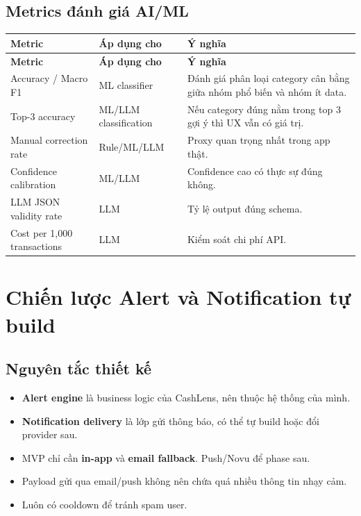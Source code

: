 \documentclass[11pt,a4paper]{article}
\renewcommand{\thead}[1]{\textbf{\color{PrimaryDark}#1}}
\newenvironment{tableblock}{\Needspace{8\baselineskip}\vspace{0.25em}}{\vspace{0.75em}}
\begin{document}
\subsection{Metrics đánh giá AI/ML}
\begin{tableblock}
\scriptsize
\begin{longtable}{L{3.5cm}L{3.6cm}L{8.1cm}}
\thead{Metric} & \thead{Áp dụng cho} & \thead{Ý nghĩa} \\
\endfirsthead
{}\thead{Metric} & \thead{Áp dụng cho} & \thead{Ý nghĩa} \\
\endhead
Accuracy / Macro F1 & ML classifier & Đánh giá phân loại category cân bằng giữa nhóm phổ biến và nhóm ít data. \\
Top-3 accuracy & ML/LLM classification & Nếu category đúng nằm trong top 3 gợi ý thì UX vẫn có giá trị. \\
Manual correction rate & Rule/ML/LLM & Proxy quan trọng nhất trong app thật. \\
Confidence calibration & ML/LLM & Confidence cao có thực sự đúng không. \\
LLM JSON validity rate & LLM & Tỷ lệ output đúng schema. \\
Cost per 1,000 transactions & LLM & Kiểm soát chi phí API. \\
\end{longtable}
\end{tableblock}

\section{Chiến lược Alert và Notification tự build}

\subsection{Nguyên tắc thiết kế}
\begin{itemize}
  \item \textbf{Alert engine} là business logic của CashLens, nên thuộc hệ thống của mình.
  \item \textbf{Notification delivery} là lớp gửi thông báo, có thể tự build hoặc đổi provider sau.
  \item MVP chỉ cần \textbf{in-app} và \textbf{email fallback}. Push/Novu để phase sau.
  \item Payload gửi qua email/push không nên chứa quá nhiều thông tin nhạy cảm.
  \item Luôn có cooldown để tránh spam user.
\end{itemize}
\end{document}
